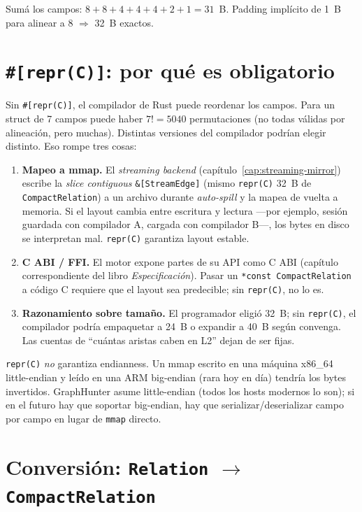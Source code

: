 \noindent
Sumá los campos: \(8 + 8 + 4 + 4 + 4 + 2 + 1 = 31\)~B. Padding
implícito de 1~B para alinear a 8 \(\Rightarrow\) 32~B exactos.

\section{\texttt{\#[repr(C)]}: por qué es obligatorio}

Sin \texttt{\#[repr(C)]}, el compilador de Rust puede reordenar los
campos. Para un struct de 7 campos puede haber \(7! = 5040\)
permutaciones (no todas válidas por alineación, pero muchas).
Distintas versiones del compilador podrían elegir distinto. Eso
rompe tres cosas:

\begin{enumerate}
    \item \textbf{Mapeo a mmap.} El \emph{streaming backend}
    (capítulo~\ref{cap:streaming-mirror}) escribe la \emph{slice
    contiguous} \texttt{\&[StreamEdge]} (mismo \texttt{repr(C)} 32~B
    de \texttt{CompactRelation}) a un archivo durante \emph{auto-spill}
    y la mapea de vuelta a memoria. Si el layout cambia entre
    escritura y lectura ---por ejemplo, sesión guardada con
    compilador A, cargada con compilador B---, los bytes en disco
    se interpretan mal. \texttt{repr(C)} garantiza layout estable.
    \item \textbf{C ABI / FFI.} El motor expone partes de su API
    como C ABI (capítulo correspondiente del libro
    \emph{Especificación}). Pasar un \texttt{*const CompactRelation}
    a código C requiere que el layout sea predecible; sin
    \texttt{repr(C)}, no lo es.
    \item \textbf{Razonamiento sobre tamaño.} El programador eligió
    32~B; sin \texttt{repr(C)}, el compilador podría empaquetar a
    24~B o expandir a 40~B según convenga. Las cuentas de
    ``cuántas aristas caben en L2'' dejan de ser fijas.
\end{enumerate}

\begin{nota}
\texttt{repr(C)} \emph{no} garantiza endianness. Un mmap escrito en
una máquina x86\_64 little-endian y leído en una ARM big-endian
(rara hoy en día) tendría los bytes invertidos. GraphHunter asume
little-endian (todos los hosts modernos lo son); si en el futuro
hay que soportar big-endian, hay que serializar/deserializar
campo por campo en lugar de \texttt{mmap} directo.
\end{nota}

\section{Conversión: \texttt{Relation} $\to$ \texttt{CompactRelation}}

